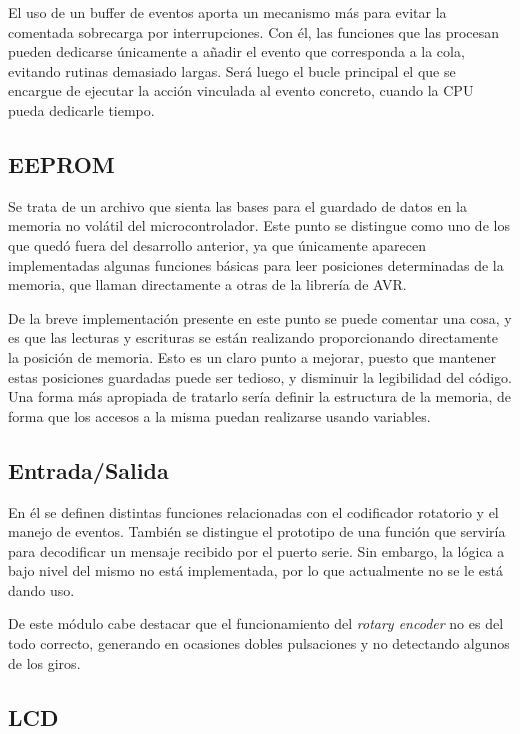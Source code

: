 El uso de un buffer de eventos aporta un mecanismo más para evitar la comentada sobrecarga por interrupciones. Con él, las funciones que las procesan pueden dedicarse únicamente a añadir el evento que corresponda a la cola, evitando rutinas demasiado largas. Será luego el bucle principal el que se encargue de ejecutar la acción vinculada al evento concreto, cuando la CPU pueda dedicarle tiempo.

\subsection{EEPROM}

Se trata de un archivo que sienta las bases para el guardado de datos en la memoria no volátil del microcontrolador. Este punto se distingue como uno de los que quedó fuera del desarrollo anterior, ya que únicamente aparecen implementadas algunas funciones básicas para leer posiciones determinadas de la memoria, que llaman directamente a otras de la librería de AVR.

De la breve implementación presente en este punto se puede comentar una cosa, y es que las lecturas y escrituras se están realizando proporcionando directamente la posición de memoria. Esto es un claro punto a mejorar, puesto que mantener estas posiciones guardadas puede ser tedioso, y disminuir la legibilidad del código. Una forma más apropiada de tratarlo sería definir la estructura de la memoria, de forma que los accesos a la misma puedan realizarse usando variables.

\subsection{Entrada/Salida}

En él se definen distintas funciones relacionadas con el codificador rotatorio y el manejo de eventos. También se distingue el prototipo de una función que serviría para decodificar un mensaje recibido por el puerto serie. Sin embargo, la lógica a bajo nivel del mismo no está implementada, por lo que actualmente no se le está dando uso.

De este módulo cabe destacar que el funcionamiento del \textit{rotary encoder} no es del todo correcto, generando en ocasiones dobles pulsaciones y no detectando algunos de los giros.

\subsection{LCD}

